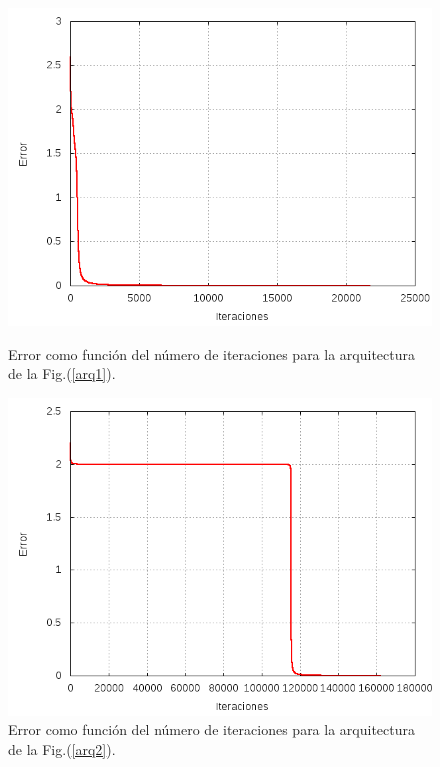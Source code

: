 \documentclass[aps,prb,onecolumn,10pt,floatfix,superscriptaddress]{article} %
\begin{document}
\begin{figure}[!htd] 
	\begin{minipage}[b]{0.450\linewidth}
   	    \includegraphics[scale=0.32 ]{xor1.png}
   	    \begin{center}
  \caption{\label{error1a} Error como funci\'on del n\'umero de iteraciones para la arquitectura de la Fig.(\ref{arq1}).}
     	    \end{center}
   \end{minipage}
   \begin{minipage}[b]{0.450\linewidth}
   	    \includegraphics[scale=0.32 ]{xor2.png}
   	     \begin{center}
  \caption{\label{error1b}  Error como funci\'on del n\'umero de iteraciones para la arquitectura de la Fig.(\ref{arq2}).}
     	    \end{center}
   \end{minipage} 
 \end{figure}
\end{document}
